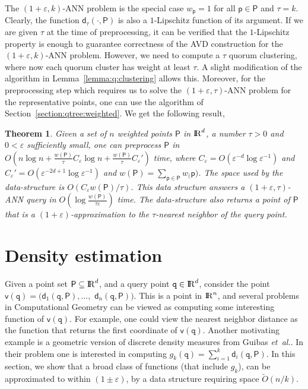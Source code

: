 \documentclass[12pt]{article}
\makeatletter
\providecommand{\lemref}[1]{Lemma~\ref{lemma:#1}}
\newtheorem{theorem}{Theorem}[section] \newtheorem{lemma}[theorem]{Lemma}
\newcommand{\Term}[1]{\textsf{#1}}
\newcommand{\TermI}[1]{\Term{#1}\index{#1@\Term{#1}}}
\theoremstyle{remark}{\theorembodyfont{\rm} \newtheorem{remark}[theorem]{Remark}}
\newcommand{\thmlab}[1]{{\label{theo:#1}}}
\newcommand{\seclab}[1]{{\label{section:#1}}}
\newcommand{\secref}[1]{Section~\ref{section:#1}}
\newcommand{\pth}[2][\!]{#1\left({#2}\right)}
\newcommand{\distPk}[3]{\mathsf{d}_{#3}\pth{#2,#1}}
\newcommand{\order}[1]{O\pth{#1}}
\newcommand{\eps}{{\varepsilon}}\newcommand{\divides}{|}
\newcommand{\wt}[1]{w_{#1}}
\newcommand{\wtX}[1]{w\pth{#1}}
\newcommand{\ANN}{\TermI{ANN}\xspace}
\newcommand{\AVD}{\TermI{AVD}\xspace}
\newcommand{\etal}{\textit{et~al.}\xspace}
\renewcommand{\Re}{{\rm I\!\hspace{-0.025em} R}}
\newcommand{\PntSet}{\mathsf{P}}
\newcommand{\query}{\mathtt{q}}
\newcommand{\pnt} {\mathsf{p}}
\newcommand{\pntB}{\mathsf{v}}
\newcommand{\Otilde}{\widetilde{O}}
\newcommand{\ds}{\displaystyle}
\newcommand{\wx}{\tau}
\makeatother
\begin{document}
The $(1+\eps,k)$-\ANN problem is the special case $\wt{\pnt} = 1$
for all $\pnt \in \PntSet$ and $\wx = k$. Clearly, the function 
$\distPk{\PntSet}{\cdot}{\wx}$ is also a $1$-Lipschitz function of its
argument. If we are given $\wx$ at the time of preprocessing, 
it can be verified that the $1$-Lipschitz property is enough to
guarantee correctness of
the \AVD construction for the $(1+\eps,k)$-\ANN problem. However, we 
need to compute a $\wx$ quorum clustering, where
now each quorum cluster has weight at least $\wx$. A slight modification
of the algorithm in \lemref{q:clustering} allows this. Moreover, for the
preprocessing step which requires us to solve the $(1+\eps,\wx)$-\ANN
problem for the representative points, one can use the algorithm of 
\secref{qtree:weighted}. We get the following result,
\begin{theorem}\thmlab{q:tree:main:w}Given a set of $n$ weighted points $\PntSet$ in $\Re^d$, a number
    $\wx > 0$ and $0 < \eps$ sufficiently small, one can preprocess
    $\PntSet$ in $\ds O \pth{ n \log n + \frac{\wtX{\PntSet}}{\wx }
       C_\eps \log n + \frac{\wtX{\PntSet}}{\wx } C_\eps'}$ time,
    where $C_\eps = O\pth{ \eps^{-d}\log {\eps}^{-1} }$ and $C_\eps' =
    O\pth{ \eps^{-2d+1}\log {\eps}^{-1} }$ and 
    $\wtX{\PntSet} = \sum_{\pnt \in \PntSet} \wt(\pnt)$. 
    The space used by the
    data-structure is $O( C_\eps \wtX{\PntSet}/\wx)$.  This data
    structure answers a $(1+\eps,\wx)$-\ANN query in $\ds \order{\log
       \frac{\wtX{\PntSet}}{\wx \eps }}$ time.  The data-structure
    also returns a point of $\PntSet$ that is a $(1+\eps)$-approximation
    to the $\wx$-nearest neighbor of the query point.
\end{theorem}


\section{Density estimation}
\seclab{applications}


Given a point set $\PntSet \subseteq \Re^d$, and a query point $\query
\in \Re^d$, consider the point $\pntB(\query) =
(\distPk{\PntSet}{\query}{1}, \dots,$ $\distPk{\PntSet}{\query}{n})$.
This is a point in $\Re^n$, and several problems in Computational
Geometry can be viewed as computing some interesting function of
$\pntB(\query)$. For example, one could view the nearest neighbor
distance as the function that returns the first coordinate of
$\pntB(\query)$. Another motivating example is a geometric version of
discrete density measures from Guibas \etal \cite{gmm-wkd-11}. In
their problem one is interested in computing $g_k(\query) =
\sum_{i=1}^k \distPk{\PntSet}{\query}{i}$. In this section, we show
that a broad class of functions (that include $g_k$), can be
approximated to within $(1 \pm \eps)$, by a data structure requiring
space $\Otilde(n/k)$.
\end{document}
